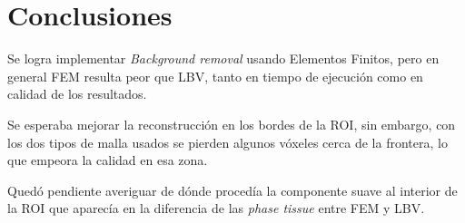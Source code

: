 \section{Conclusiones}

Se logra implementar \textit{Background removal} usando Elementos Finitos, pero en general FEM resulta peor que LBV, tanto en tiempo de ejecución como en calidad de los resultados.

Se esperaba mejorar la reconstrucción en los bordes de la ROI, sin embargo, con los dos tipos de malla usados se pierden algunos vóxeles cerca de la frontera, lo que empeora la calidad en esa zona.

Quedó pendiente averiguar de dónde procedía la componente suave al interior de la ROI que aparecía en la diferencia de las \textit{phase tissue} entre FEM y LBV.

